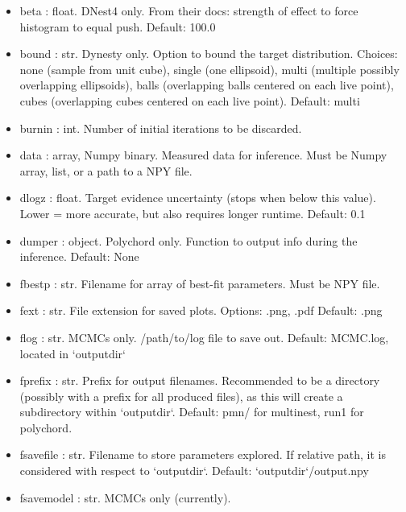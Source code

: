 \documentclass[letterpaper, 12pt]{article}
\begin{document}
\begin{itemize}
\item beta : float. DNest4 only. From their docs: strength of effect 
                    to force histogram to equal push.  Default: 100.0
\item bound : str. Dynesty only. Option to bound the target  
                   distribution. Choices: none (sample from unit  
                   cube), single (one ellipsoid), multi (multiple  
                   possibly overlapping ellipsoids), balls  
                   (overlapping balls centered on each live point),  
                   cubes (overlapping cubes centered on each live  
                   point).  Default: multi
\item burnin : int. Number of initial iterations to be discarded.
\item data : array, Numpy binary. Measured data for inference.  
                    Must be Numpy array, list, or a path to a NPY file.
\item dlogz : float. Target evidence uncertainty (stops when below  
                     this value).  Lower = more accurate, but also 
                     requires longer runtime. Default: 0.1
\item dumper : object.  Polychord only.  Function to output info 
                        during the inference.  Default: None
\item fbestp : str. Filename for array of best-fit parameters.  
                    Must be NPY file.
\item fext : str. File extension for saved plots.  
                  Options: .png, .pdf  Default: .png
\item flog : str. MCMCs only. /path/to/log file to save out.  
                  Default: MCMC.log, located in `outputdir`
\item fprefix : str. Prefix for output filenames. Recommended to be 
                     a directory (possibly with a prefix for all 
                     produced files), as this will create a 
                     subdirectory within `outputdir`. 
                     Default: pmn/ for multinest, 
                              run1 for polychord.
\item fsavefile : str. Filename to store parameters explored.  
                            If relative path, it is considered with  
                            respect to `outputdir`.   
                            Default: `outputdir`/output.npy
\item fsavemodel : str. MCMCs only (currently). 

\end{itemize}
\end{document}
